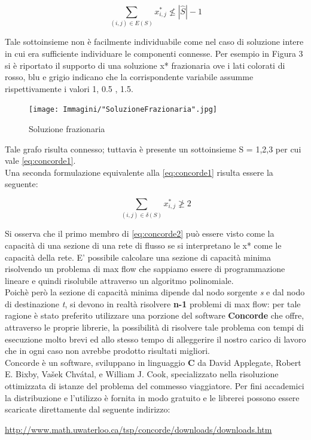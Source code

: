 \documentclass[11pt]{article}
\begin{document}
\begin{equation}\label{eq:concorde1}
\displaystyle{\sum_{\left ( i,j \right )\in E\left ( S \right )} x_{i,j}^{*}\nleqslant \left | \widehat{S} \right |-1}
\end{equation}

Tale sottoinsieme non è facilmente individuabile come nel caso di soluzione intere in cui era sufficiente individuare le componenti connesse. Per esempio in Figura 3 si è riportato il supporto di una soluzione x* frazionaria ove i lati colorati di rosso, blu e grigio indicano che la corrispondente variabile assumme rispettivamente i valori 1, 0.5 , 1.5.

\begin{figure}[htbp]
    \centering
    \texttt{[image: Immagini/"SoluzioneFrazionaria".jpg]}
    \caption{Soluzione frazionaria}
\end{figure}

Tale grafo risulta connesso; tuttavia è presente un sottoinsieme S = {1,2,3} per cui vale \eqref{eq:concorde1}.\\
Una seconda formulazione equivalente alla \eqref{eq:concorde1} risulta essere la seguente:

\begin{equation}\label{eq:concorde2}
\displaystyle{\sum_{\left ( i,j \right )\in \delta \left ( S \right )} x_{i,j}^{*}\ngeqslant 2}
\end{equation}

Si osserva che il primo membro di \eqref{eq:concorde2} può essere visto come la capacità di una sezione di una rete di flusso se si interpretano le x* come le capacità della rete.
E' possibile calcolare una sezione di capacità minima risolvendo un problema di max flow che sappiamo essere di programmazione lineare e quindi risolubile attraverso un algoritmo polinomiale.\\
Poichè però la sezione di capacità minima dipende dal nodo sorgente \textit{s} e dal nodo di destinazione \textit{t}, si devono in realtà risolvere \textbf{n-1} problemi di max flow: per tale ragione è stato preferito utilizzare una porzione del software \textbf{Concorde} che offre, attraverso le proprie librerie, la possibilità di risolvere tale problema con tempi di esecuzione molto brevi ed allo stesso tempo di alleggerire il nostro carico di lavoro che in ogni caso non avrebbe prodotto risultati migliori.\\
Concorde è un software, sviluppano in linguaggio \textbf{C} da David Applegate, Robert E. Bixby, Vašek Chvátal, e William J. Cook, specializzato nella risoluzione ottimizzata di istanze del problema del commesso viaggiatore. Per fini accademici la distribuzione e l'utilizzo è fornita in modo gratuito e le librerei possono essere scaricate direttamente dal seguente indirizzo:
\begin{center}
\href{http://www.math.uwaterloo.ca/tsp/concorde/downloads/downloads.htm}{http://www.math.uwaterloo.ca/tsp/concorde/downloads/downloads.htm}
\end{center}
\end{document}
